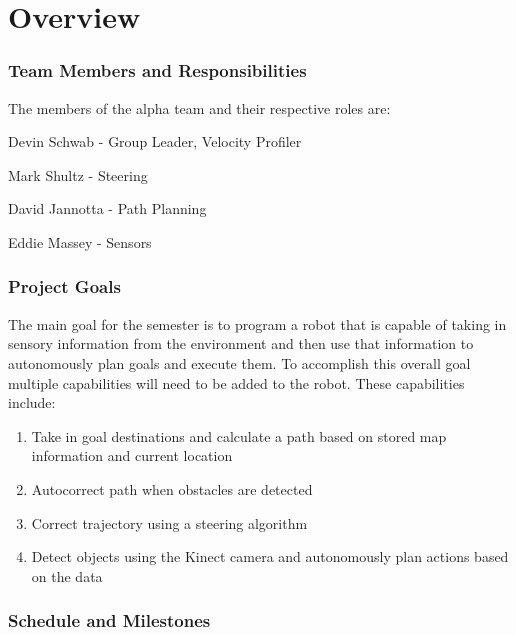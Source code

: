 \part{Overview}

\section{Team Members and Responsibilities}

The members of the alpha team and their respective roles are:

Devin Schwab - Group Leader, Velocity Profiler

Mark Shultz - Steering

David Jannotta - Path Planning

Eddie Massey - Sensors


\section{Project Goals}
The main goal for the semester is to program a robot that is capable
of taking in sensory information from the environment and then use
that information to autonomously plan goals and execute them.  To
accomplish this overall goal multiple capabilities will need to be
added to the robot.  These capabilities include:

\begin{enumerate}
\item Take in goal destinations and calculate a path based on stored
  map information and current location
\item Autocorrect path when obstacles are detected
\item Correct trajectory using a steering algorithm
\item Detect objects using the Kinect camera and autonomously plan
  actions based on the data
\end{enumerate}


\section{Schedule and Milestones}

